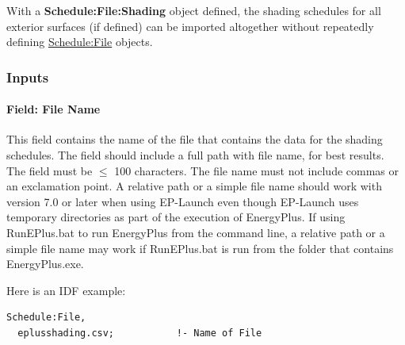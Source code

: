 With a \textbf{Schedule:File:Shading} object defined, the shading schedules for all exterior surfaces (if defined) can be imported altogether without repeatedly defining \hyperref[schedulefile]{Schedule:File} objects.

\subsubsection{Inputs}\label{inputs-schedule-file-shading}

\paragraph{Field: File Name}\label{schedulefileshading-field-file-name}

This field contains the name of the file that contains the data for the shading schedules. The field should include a full path with file name, for best results. The field must be \(\le\) 100 characters. The file name must not include commas or an exclamation point. A relative path or a simple file name should work with version 7.0 or later when using EP-Launch even though EP-Launch uses temporary directories as part of the execution of EnergyPlus. If using RunEPlus.bat to run EnergyPlus from the command line, a relative path or a simple file name may work if RunEPlus.bat is run from the folder that contains EnergyPlus.exe.

Here is an IDF example:

\begin{lstlisting}
Schedule:File,
  eplusshading.csv;           !- Name of File
\end{lstlisting}

